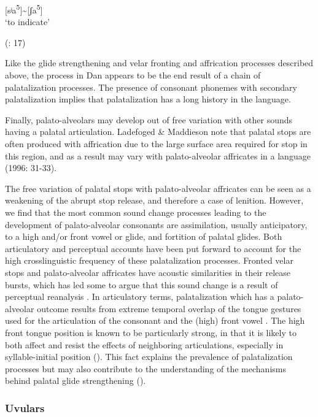 [sʲa\textsuperscript{5}]{\textasciitilde}[ʃa\textsuperscript{5}]\\
\glt ‘to indicate’

(\citealt{BearthZemp1967}: 17)
\z

Like the glide strengthening and velar fronting and affrication processes described above, the process in Dan appears to be the end result of a chain of palatalization processes. The presence of consonant phonemes with secondary palatalization implies that palatalization has a long history in the language.

  Finally, palato-alveolars may develop out of free variation with other sounds having a palatal articulation. Ladefoged \& Maddieson note that palatal stops are often produced with affrication due to the large surface area required for stop in this region, and as a result may vary with palato-alveolar affricates in a language (1996: 31-33).

  The free variation of palatal stops with palato-alveolar affricates can be seen as a weakening of the abrupt stop release, and therefore a case of lenition. However, we find that the most common sound change processes leading to the development of palato-alveolar consonants are assimilation, usually anticipatory, to a high and/or front vowel or glide, and fortition of palatal glides. Both articulatory and perceptual accounts have been put forward to account for the high crosslinguistic frequency of these palatalization processes. Fronted velar stops and palato-alveolar affricates have acoustic similarities in their release bursts, which has led some to argue that this sound change is a result of perceptual reanalysis \citep{Guion1998}. In articulatory terms, palatalization which has a palato-alveolar outcome results from extreme temporal overlap of the tongue gestures used for the articulation of the consonant and the (high) front vowel \citep{Bateman2007}. The high front tongue position is known to be particularly strong, in that it is likely to both affect and resist the effects of neighboring articulations, especially in syllable-initial position (\citealt{RecasensEspinosa2009,Recasens2014}). This fact explains the prevalence of palatalization processes but may also contribute to the understanding of the mechanisms behind palatal glide strengthening (\citealt{BybeeEasterday2019}).

\subsubsection{{Uvulars}}\label{sec:4.5.2.2}

